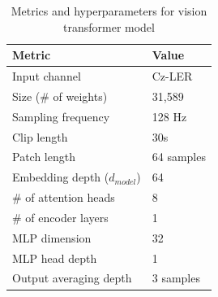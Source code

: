 \begin{table}[ht]
    \centering
    \renewcommand{\arraystretch}{1.2} %
    \setlength{\arrayrulewidth}{1.5pt} %
    \caption{Metrics and hyperparameters for vision transformer model}
    \begin{tabularx}{0.7\textwidth}{@{} *1X *1l @{}}
        \toprule
        Metric                          & Value \\\midrule
        Input channel                   & Cz-LER        \\
        Size (\# of weights)            & 31,589        \\
        Sampling frequency              & 128 Hz        \\
        Clip length                     & 30s           \\
        Patch length                    & 64 samples    \\
        Embedding depth ($d_{model}$)   & 64            \\
        \# of attention heads           & 8             \\
        \# of encoder layers            & 1             \\
        MLP dimension                   & 32            \\
        MLP head depth                  & 1             \\
        Output averaging depth          & 3 samples     \\ \bottomrule 
    \end{tabularx}
    \label{tab:model_param}
\end{table}
